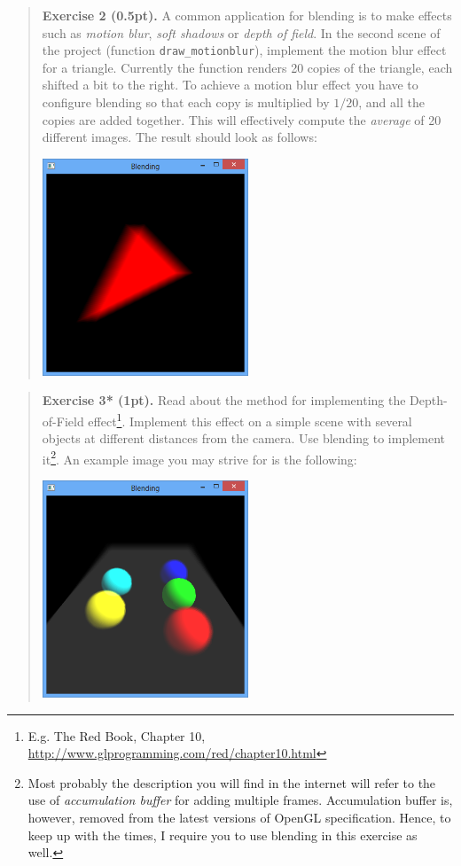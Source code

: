 \documentclass{article}
\newenvironment{exercise}[2]{\begin{verse}\textbf{Exercise #1 (#2pt).} }{
\end{verse}\medskip}
\begin{document}
\begin{exercise}{2}{0.5}
A common application for blending is to make effects such as \emph{motion blur}, \emph{soft shadows} or \emph{depth of field}. In the second scene of the project (function \verb#draw_motionblur#), implement the motion blur effect for a triangle. Currently the function renders 20 copies of the triangle, each shifted a bit to the right. To achieve a motion blur effect you have to configure blending so that each copy is multiplied by $1/20$, and all the copies are added together. This will effectively compute the \emph{average} of 20 different images. The result should look as follows:
\begin{center}
\includegraphics[width=0.5\textwidth]{motionblur.png}
\end{center}
\end{exercise}

\begin{exercise}{3*}{1}
Read about the method for implementing the Depth-of-Field effect\footnote{E.g. The Red Book, Chapter 10, \url{http://www.glprogramming.com/red/chapter10.html}}. Implement this effect on a simple scene with several objects at different distances from the camera. Use blending to implement it\footnote{Most probably the description you will find in the internet will refer to the use of \emph{accumulation buffer} for adding multiple frames. Accumulation buffer is, however, removed from the latest versions of OpenGL specification. Hence, to keep up with the times, I require you to use blending in this exercise as well.}. An example image you may strive for is the following:
\begin{center}
\includegraphics[width=0.5\textwidth]{dof.png}
\end{center}
\end{exercise}
\end{document}
